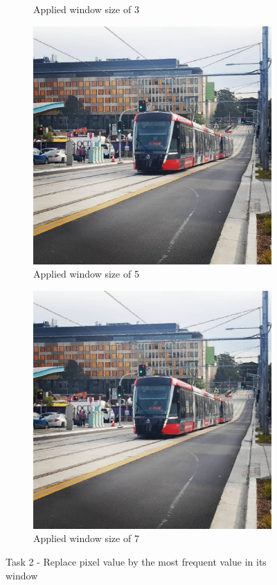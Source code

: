 \documentclass{article}
\begin{document}
\begin{figure}[!h]
\begin{subfigure}[b]{0.4\linewidth}
    \caption{Applied window size of 3}
  \end{subfigure}
  \begin{subfigure}[b]{0.4\linewidth}
    \includegraphics[width=\linewidth]{task3__light_rail_5.jpg}
    \caption{Applied window size of 5}
  \end{subfigure}
  \begin{subfigure}[b]{0.4\linewidth}
    \includegraphics[width=\linewidth]{task3__light_rail_7.jpg}
    \caption{Applied window size of 7}
  \end{subfigure}
  \caption{Task 2 - Replace pixel value by the most frequent value in its window}
  \label{fig:task2}
\end{figure}
\end{document}
